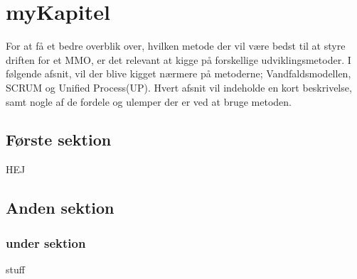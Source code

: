 \cfoot{\page\textbackslash \totalp} %
\chapter{myKapitel}
For at få et bedre overblik over, hvilken metode der vil være bedst til at styre driften for et MMO, er det relevant at kigge på forskellige udviklingsmetoder. I følgende afsnit, vil der blive kigget nærmere på metoderne; Vandfaldsmodellen, SCRUM og Unified Process(UP). Hvert afsnit vil indeholde en kort beskrivelse, samt nogle af de fordele og ulemper der er ved at bruge metoden.\\
\section{Første sektion}

HEJ 
\section{Anden sektion}

\subsection{under sektion}

\cite{HTL}stuff
